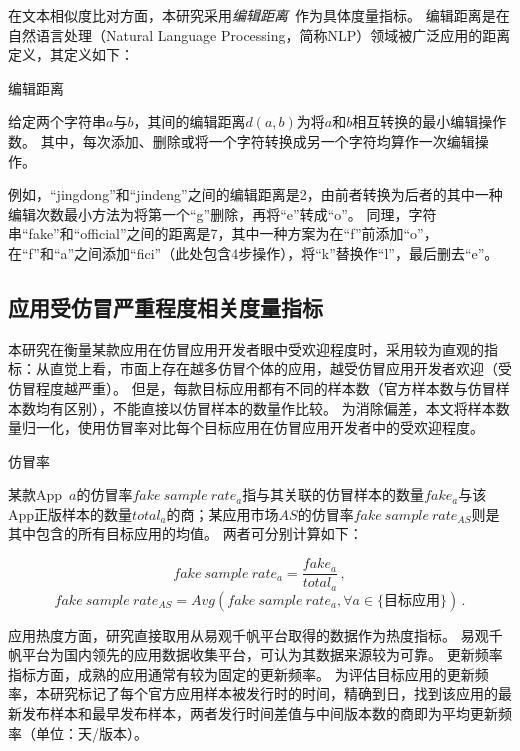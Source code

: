 在文本相似度比对方面，本研究采用\textit{编辑距离}~\cite{levenshtein1966binary}作为具体度量指标。
编辑距离是在自然语言处理（Natural Language Processing，简称NLP）领域被广泛应用的距离定义，其定义如下：

\begin{Def}
    编辑距离

    给定两个字符串$a$与$b$，其间的编辑距离$d(a, b)$为将$a$和$b$相互转换的最小编辑操作数。
    其中，每次添加、删除或将一个字符转换成另一个字符均算作一次编辑操作。
\end{Def}

例如，``jingdong''和``jindeng''之间的编辑距离是2，由前者转换为后者的其中一种编辑次数最小方法为将第一个``g''删除，再将``e''转成``o''。
同理，字符串``fake''和``official''之间的距离是7，其中一种方案为在``f''前添加``o''，在``f''和``a''之间添加``fici''（此处包含4步操作），将``k''替换作``l''，最后删去``e''。

\subsection{应用受仿冒严重程度相关度量指标}

本研究在衡量某款应用在仿冒应用开发者眼中受欢迎程度时，采用较为直观的指标：从直觉上看，市面上存在越多仿冒个体的应用，越受仿冒应用开发者欢迎（受仿冒程度越严重）。
但是，每款目标应用都有不同的样本数（官方样本数与仿冒样本数均有区别），不能直接以仿冒样本的数量作比较。
为消除偏差，本文将样本数量归一化，使用仿冒率对比每个目标应用在仿冒应用开发者中的受欢迎程度。

\begin{Def}
    仿冒率

    某款App~$a$的仿冒率$fake~sample~rate_a$指与其关联的仿冒样本的数量$fake_a$与该App正版样本的数量$total_a$的商；某应用市场$AS$的仿冒率$fake~sample~rate_{AS}$则是其中包含的所有目标应用的均值。
    两者可分别计算如下：
\end{Def}

\begin{equation}
    fake~sample~rate_a = \frac{fake_a}{total_a} \,,
    \label{equ:fake_rate_app}
\end{equation}
\begin{equation}
    fake~sample~rate_{AS} = Avg(fake~sample~rate_a, \forall a \in \text{\{目标应用\}}) \,.
    \label{equ:fake_rate_mkt}
\end{equation}

应用热度方面，研究直接取用从易观千帆平台取得的数据作为热度指标。
易观千帆平台为国内领先的应用数据收集平台，可认为其数据来源较为可靠。
更新频率指标方面，成熟的应用通常有较为固定的更新频率。
为评估目标应用的更新频率，本研究标记了每个官方应用样本被发行时的时间，精确到日，找到该应用的最新发布样本和最早发布样本，两者发行时间差值与中间版本数的商即为平均更新频率（单位：天/版本）。

